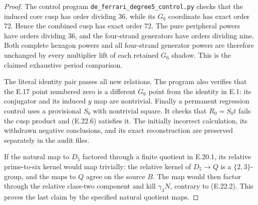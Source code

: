 \begin{proof}
The control program
\texttt{de\_ferrari\_degree5\_control.py}
checks that the induced
core cusp has order
dividing 36, while its
$G_6$ coordinate has
exact order 72. Hence
the combined cusp has
exact order 72. The
pure peripheral powers
have orders dividing 36,
and the four-strand
generators have orders
dividing nine. Both
complete hexagon powers
and all four-strand
generator powers are
therefore unchanged by
every multiplier lift
of each retained $G_6$
shadow. This is the
claimed exhaustive
period comparison.

The literal identity
pair passes all new
relations. The program
also verifies that the
E.17 point numbered
zero is a different
$G_6$ point from the
identity in E.1: its
conjugator and its
induced $y$ map are
nontrivial. Finally a
permanent regression
control uses a
provisional $S_0$ with
nontrivial square. It
checks that $R_0=S_0t$
fails the cusp product
and (E.22.6) satisfies
it. The initially
incorrect calculation,
its withdrawn negative
conclusions, and its
exact reconstruction
are preserved separately
in the audit files.

If the natural map to
$D_5$ factored through
a finite quotient in
E.20.1, its relative
prime-to-six kernel
would map trivially:
the relative kernel
of $D_5\to Q$ is a
$\{2,3\}$-group, and
the maps to $Q$ agree
on the source $B$.
The map would then
factor through the
relative class-two
component and kill
$\gamma_3N$, contrary
to (E.22.2). This
proves the last claim
by the specified
natural quotient maps.
\end{proof}
